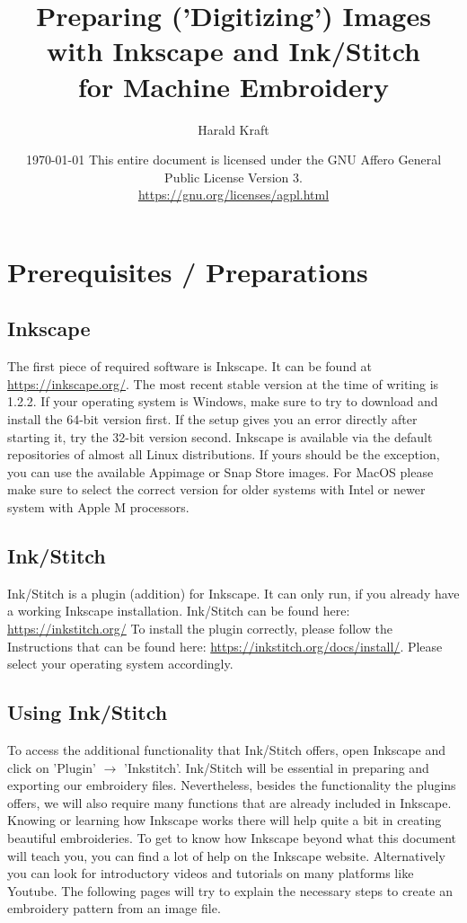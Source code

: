 \documentclass{article}
\title{
    Preparing ('Digitizing') Images with Inkscape and Ink/Stitch\\
    for Machine Embroidery}
\author{Harald Kraft}
\date{
    \today
    \bigbreak
    This entire document is licensed under the GNU Affero General Public License Version 3.\\
    \url{https://gnu.org/licenses/agpl.html}}
\begin{document}
    \maketitle

    \tableofcontents

    \pagebreak

    \section{Prerequisites / Preparations}
        \subsection{Inkscape}
            The first piece of required software is Inkscape. It can be found at \url{https://inkscape.org/}. The most recent stable version at the time of writing is 1.2.2.
            If your operating system is Windows, make sure to try to download and install the 64-bit version first. If the setup gives you an error directly after starting it, try the 32-bit version second.
            Inkscape is available via the default repositories of almost all Linux distributions. If yours should be the exception, you can use the available Appimage or Snap Store images.
            For MacOS please make sure to select the correct version for older systems with Intel or newer system with Apple M processors.

        \subsection{Ink/Stitch}

            Ink/Stitch is a plugin (addition) for Inkscape. It can only run, if you already have a working Inkscape installation. Ink/Stitch can be found here: \url{https://inkstitch.org/}
            To install the plugin correctly, please follow the Instructions that can be found here: \url{https://inkstitch.org/docs/install/}. Please select your operating system accordingly.

        \subsection{Using Ink/Stitch}

            To access the additional functionality that Ink/Stitch offers, open Inkscape and click on 'Plugin' $\rightarrow$ 'Inkstitch'.
            Ink/Stitch will be essential in preparing and exporting our embroidery files. Nevertheless, besides the functionality the plugins offers, we will also require many functions that are already included in Inkscape.
            Knowing or learning how Inkscape works there will help quite a bit in creating beautiful embroideries.
            To get to know how Inkscape beyond what this document will teach you, you can find a lot of help on the Inkscape website. Alternatively you can look for introductory videos and tutorials on many platforms like Youtube.
            \smallbreak
            The following pages will try to explain the necessary steps to create an embroidery pattern from an image file.
\end{document}
